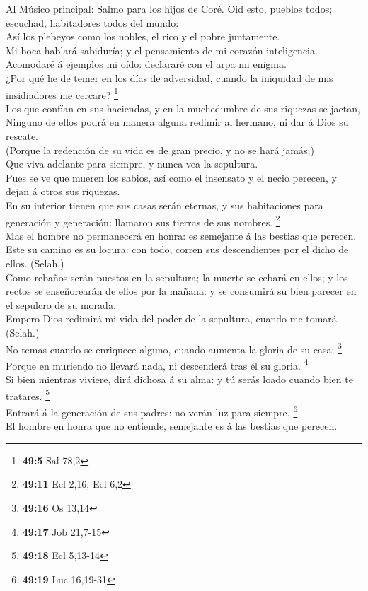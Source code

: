  Al Músico principal: Salmo para los hijos de Coré. Oid
esto, pueblos todos; escuchad, habitadores todos del mundo:\\
 Así los plebeyos como los nobles, el rico y el pobre
juntamente.\\
 Mi boca hablará sabiduría; y el pensamiento de mi corazón
inteligencia.\\
 Acomodaré á ejemplos mi oído: declararé con el arpa mi
enigma.\\
 ¿Por qué he de temer en los días de adversidad, cuando la
iniquidad de mis insidiadores me cercare? \footnote{\textbf{49:5} Sal
  78,2}\\
 Los que confían en sus haciendas, y en la muchedumbre de
sus riquezas se jactan,\\
 Ninguno de ellos podrá en manera alguna redimir al hermano,
ni dar á Dios su rescate.\\
 (Porque la redención de su vida es de gran precio, y no se
hará jamás;)\\
 Que viva adelante para siempre, y nunca vea la sepultura.\\
 Pues se ve que mueren los sabios, así como el insensato y
el necio perecen, y dejan á otros sus riquezas.\\
 En su interior tienen que sus casas serán eternas, y sus
habitaciones para generación y generación: llamaron sus tierras de sus
nombres. \footnote{\textbf{49:11} Ecl 2,16; Ecl 6,2}\\
 Mas el hombre no permanecerá en honra: es semejante á las
bestias que perecen.\\
 Este su camino es su locura: con todo, corren sus
descendientes por el dicho de ellos. (Selah.)\\
 Como rebaños serán puestos en la sepultura; la muerte se
cebará en ellos; y los rectos se enseñorearán de ellos por la mañana: y
se consumirá su bien parecer en el sepulcro de su morada.\\
 Empero Dios redimirá mi vida del poder de la sepultura,
cuando me tomará. (Selah.)\\
 No temas cuando se enriquece alguno, cuando aumenta la
gloria de su casa; \footnote{\textbf{49:16} Os 13,14}\\
 Porque en muriendo no llevará nada, ni descenderá tras él
su gloria. \footnote{\textbf{49:17} Job 21,7-15}\\
 Si bien mientras viviere, dirá dichosa á su alma: y tú
serás loado cuando bien te tratares. \footnote{\textbf{49:18} Ecl
  5,13-14}\\
 Entrará á la generación de sus padres: no verán luz para
siempre. \footnote{\textbf{49:19} Luc 16,19-31}\\
 El hombre en honra que no entiende, semejante es á las
bestias que perecen.

